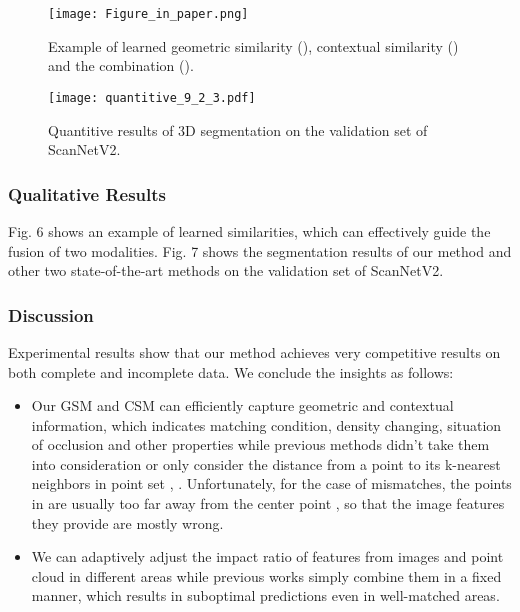 \documentclass[letterpaper, 10 pt, conference]{ieeeconf}
\begin{document}
\begin{figure}[t]
\centering
\texttt{[image: Figure\_in\_paper.png]}
\vspace{-3mm}
\caption{Example of learned geometric similarity (), contextual similarity () and the combination ().}
\vspace{-3mm}
\end{figure}

\begin{figure}[t]
\centering
\texttt{[image: quantitive\_9\_2\_3.pdf]}
\vspace{-4mm}
\caption{Quantitive results of 3D segmentation on the validation set of ScanNetV2.}
\vspace{-7mm}
\end{figure}

\subsubsection{\textbf{Qualitative Results}}
Fig. 6 shows an example of learned similarities, which can effectively guide the fusion of two modalities.
Fig. 7 shows the segmentation results of our method and other two state-of-the-art methods on the validation set of ScanNetV2.


\subsubsection{\textbf{Discussion}}
Experimental results show that our method achieves very competitive results on both complete and incomplete data. We conclude the insights as follows:
\begin{itemize}

\item Our GSM and CSM can efficiently capture geometric and contextual information, which indicates matching condition, density changing, situation of occlusion and other properties while previous methods didn't take them into consideration or only consider the distance from a point to its k-nearest neighbors in point set , . Unfortunately, for the case of mismatches, the points in  are usually too far away from the center point , so that the image features they provide are mostly wrong. 
\item We can adaptively adjust the impact ratio of features from images and point cloud in different areas while previous works simply combine them in a fixed manner, which results in suboptimal predictions even in well-matched areas.

\end{itemize}
\end{document}
